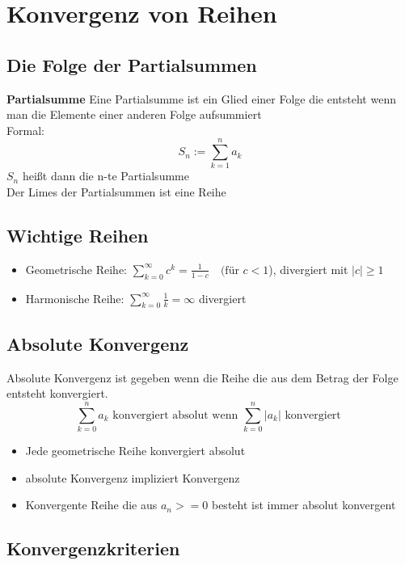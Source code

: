 \documentclass[12pt,a4paper]{article}
\begin{document}
\section{Konvergenz von Reihen}
\subsection{Die Folge der Partialsummen}
\textbf{Partialsumme}
Eine Partialsumme ist ein Glied einer Folge die entsteht wenn man die Elemente einer anderen Folge aufsummiert\\
Formal: \[S_n :=\sum_{k=1}^{n}a_k\]
$S_n$ heißt dann die n-te Partialsumme\\
Der Limes der Partialsummen ist eine Reihe\\
\subsection{Wichtige Reihen}
\begin{itemize}
	\item Geometrische Reihe: $\sum_{k=0}^\infty c^k=\frac{1}{1-c}\quad\text{(für }c<1$), divergiert mit $|c|\geq 1$
	\item Harmonische Reihe: $\sum_{k=0}^\infty \frac{1}{k}=\infty$ divergiert
\end{itemize}

\subsection{Absolute Konvergenz}
Absolute Konvergenz ist gegeben wenn die Reihe die aus dem Betrag der Folge entsteht konvergiert.\\
\[\sum_{k=0}^n a_k \text{ konvergiert absolut wenn } \sum_{k=0}^n |a_k| \text{ konvergiert }\]
\begin{itemize}
	\item Jede geometrische Reihe konvergiert absolut
	\item absolute Konvergenz impliziert Konvergenz
	\item Konvergente Reihe die aus $a_n>=0$ besteht ist immer absolut konvergent
\end{itemize}

\subsection{Konvergenzkriterien}
\end{document}
